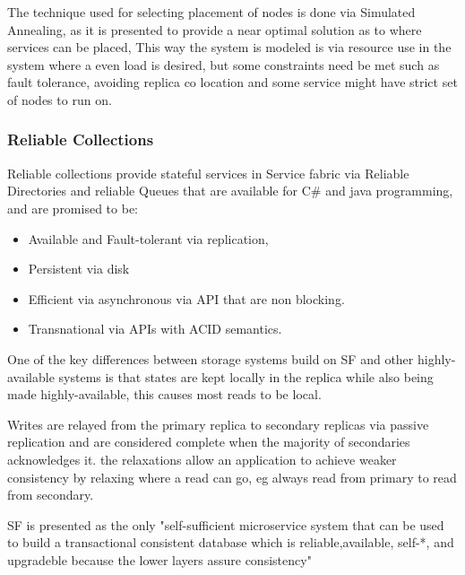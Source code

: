 \documentclass[a4paper,10pt,titlepage]{report}
\begin{document}
    The technique used for selecting placement of nodes is done via Simulated Annealing, as it is presented to provide a near optimal solution as to where services can be placed, This way the system is modeled is via resource use in the system where a even load is desired, but some constraints need be met such as fault tolerance, avoiding replica co location and some service might have strict set of nodes to run on. \\
    \vspace{5mm}

    \subsubsection{Reliable Collections}

    Reliable collections provide stateful services in Service fabric via Reliable Directories and reliable Queues that are available for C\# and java programming, and are promised to be:
    \begin{itemize}
        \item Available and Fault-tolerant via replication,
        \item Persistent via disk
        \item Efficient via asynchronous via API that are non blocking.
        \item Transnational via APIs with ACID semantics.
    \end{itemize}

    One of the key differences between storage systems build on SF and other highly-available systems is that states are kept locally in the replica while also being made highly-available, this causes most reads to be local.\\
    \vspace{5mm}

    Writes are relayed from the primary replica to secondary replicas via passive replication and are considered complete when the majority of secondaries acknowledges it. the relaxations allow an application to achieve weaker consistency by relaxing where a read can go, eg always read from primary to read from secondary. \\
    \vspace{5mm}

    SF is presented as the only "self-sufficient microservice system that can be used to build a transactional consistent database which is reliable,available, self-*, and upgradeble because the lower layers assure consistency"\cite{SFpaper} \\
    \vspace{5mm}
\end{document}
